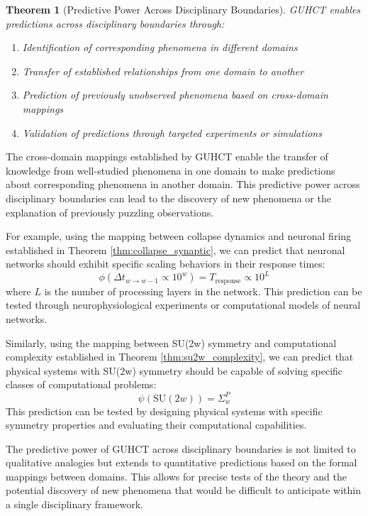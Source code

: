 \documentclass[11pt,a4paper]{article}
\makeatletter
\newtheorem{theorem}{Theorem}[section]
\renewenvironment{proof}[1][\proofname]{\par
  \pushQED{\qed}%
  \normalfont \topsep6\p@\@plus6\p@\relax
  \trivlist
  \item[\hskip\labelsep
        \itshape
    #1\@addpunct{.}]\ignorespaces
}{%
  \popQED\endtrivlist\@endpefalse
}
\makeatother
\begin{document}
\begin{theorem}[Predictive Power Across Disciplinary Boundaries]
\label{thm:cross_disciplinary_prediction}
GUHCT enables predictions across disciplinary boundaries through:
\begin{enumerate}
    \item Identification of corresponding phenomena in different domains
    \item Transfer of established relationships from one domain to another
    \item Prediction of previously unobserved phenomena based on cross-domain mappings
    \item Validation of predictions through targeted experiments or simulations
\end{enumerate}
\end{theorem}

\begin{proof}
The cross-domain mappings established by GUHCT enable the transfer of knowledge from well-studied phenomena in one domain to make predictions about corresponding phenomena in another domain. This predictive power across disciplinary boundaries can lead to the discovery of new phenomena or the explanation of previously puzzling observations.

For example, using the mapping between collapse dynamics and neuronal firing established in Theorem \ref{thm:collapse_synaptic}, we can predict that neuronal networks should exhibit specific scaling behaviors in their response times:
\begin{equation}
\phi(\Delta t_{w \to w-1} \propto 10^w) = T_{\text{response}} \propto 10^L
\end{equation}
where $L$ is the number of processing layers in the network. This prediction can be tested through neurophysiological experiments or computational models of neural networks.

Similarly, using the mapping between SU(2w) symmetry and computational complexity established in Theorem \ref{thm:su2w_complexity}, we can predict that physical systems with SU(2w) symmetry should be capable of solving specific classes of computational problems:
\begin{equation}
\psi(\text{SU}(2w)) = \Sigma_w^P
\end{equation}
This prediction can be tested by designing physical systems with specific symmetry properties and evaluating their computational capabilities.

The predictive power of GUHCT across disciplinary boundaries is not limited to qualitative analogies but extends to quantitative predictions based on the formal mappings between domains. This allows for precise tests of the theory and the potential discovery of new phenomena that would be difficult to anticipate within a single disciplinary framework.
\end{proof}
\end{document}
